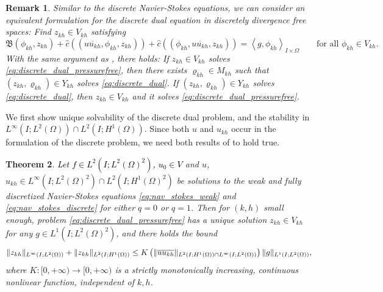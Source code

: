 \documentclass{m2an}
\newcommand\blue[1]{\textcolor{black}{#1}}
\newtheorem{theorem}{Theorem}[section]
\newtheorem{remark}[theorem]{Remark}
\newcommand{\IOpair}[1]{\left\langle #1 \right\rangle_{I\times\Omega}}
\newcommand{\chatIO}[1]{\hat c \left(\!\left( #1 \right)\!\right)}
\newcommand{\uukh}{\overline{uu_{kh}}}
\newcommand{\Vkh}{V_{kh}}
\newcommand{\Mkh}{M_{kh}}
\newcommand{\Xkh}{Y_{kh}}
\newcommand{\ukh}{u_{kh}}
\newcommand{\zkh}{z_{kh}}
\newcommand{\rhokh}{\varrho_{kh}}
\newcommand{\Hone}{H^{1}(\Omega)}
\newcommand{\dualrhs}{g}
\newcommand{\OseenConstant}{K\left(\|\uukh\|_{L^2(I;H^1(\Omega))\cap L^\infty(I;L^2(\Omega))}\right)}
\begin{document}
\begin{remark}\label{rem:dual_pressure_existence}
  Similar to the discrete Navier-Stokes equations, we can consider an equivalent formulation 
  for the discrete dual equation
  in discretely divergence free spaces: Find $\zkh \in \Vkh$ satisfying
\begin{equation}\label{eq:discrete_dual_pressurefree}
  \mathfrak B(\phi_{kh},\zkh) + \chatIO{\uukh,\phi_{kh},\zkh} + \chatIO{\phi_{kh},\uukh,\zkh}
  = \IOpair{\dualrhs,\phi_{kh}}
  \qquad \text{for all } \phi_{kh} \in \Vkh.
\end{equation}
With the same argument as \cite[Proposition 4.3]{behringer_fully_2022}, there holds:
If $\zkh \in \Vkh$ solves \eqref{eq:discrete_dual_pressurefree}, then there exists $\rhokh \in \Mkh$
such that $(\zkh,\rhokh) \in \Xkh$ solves \eqref{eq:discrete_dual}. If  $(\zkh,\rhokh) \in \Xkh$ solves
\eqref{eq:discrete_dual}, then $\zkh \in \Vkh$ and it solves \eqref{eq:discrete_dual_pressurefree}.
\end{remark}
We first show unique solvability of the discrete dual problem, and the stability in $L^\infty(I;L^2(\Omega)) \cap L^2(I;H^1(\Omega))$. Since both $u$ and $\ukh$ occur in the formulation of the discrete problem,
we need both results of  to hold true. 
\begin{theorem}\label{thm:discrete_dual_oseen}
  \blue{Let $f \in L^2(I;L^2(\Omega)^2)$, $u_0 \in V$ }
  and $u$,$u_{kh} \in L^\infty(I;L^2(\Omega)^2) \cap L^2(I;H^1(\Omega)^2)$
  be solutions to the weak and fully discretized Navier-Stokes
  equations \eqref{eq:nav_stokes_weak} and \eqref{eq:nav_stokes_discrete}
  for either $q=0$ or $q=1$.
  Then for $(k,h)$ small enough, problem \eqref{eq:discrete_dual_pressurefree} has a unique solution 
  $\zkh \in \Vkh$ for any $\dualrhs \in L^1(I;L^2(\Omega)^2)$, and there holds the bound
  \begin{equation*}
    \|\zkh\|_{L^\infty(I;L^2(\Omega))} + \|\zkh\|_{L^2(I;\blue{\Hone})}
    \le \OseenConstant \|\dualrhs\|_{L^1(I;L^2(\Omega))},
  \end{equation*}
  where $K:[0, + \infty) \to [0, + \infty)$ is a strictly monotonically increasing, continuous
  nonlinear function, independent of $k,h$.
\end{theorem}
\end{document}
